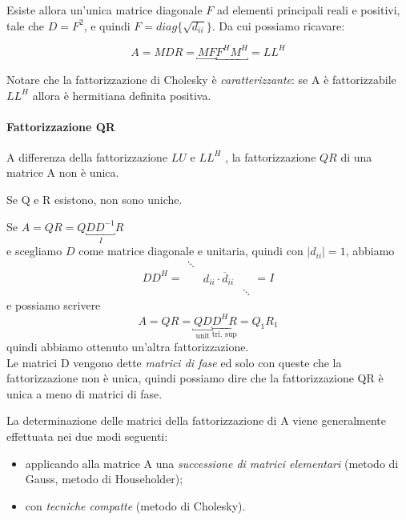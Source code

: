 \begin{thproof}
Esiste allora un’unica matrice diagonale $F$ ad elementi principali
reali e positivi, tale che $D = F^2$, e quindi $F =
diag\{\sqrt{d_{ii}}\}$. Da cui possiamo ricavare:

$$ A = MDR = \underbracket{M F} \underbracket{F^H M^H} = LL^H $$

Notare che la fattorizzazione di Cholesky \`e \emph{caratterizzante}: se
A \`e fattorizzabile $LL^H$ allora \`e hermitiana definita positiva.
\end{thproof}


\paragraph{Fattorizzazione QR}\label{fatt:QR}
A differenza della fattorizzazione $LU$ e $LL^H$ , la fattorizzazione $QR$ di
una matrice A non \`e unica. 

\begin{observation}
  Se Q e R esistono, non sono uniche.
\end{observation}
\begin{thproof}
  Se $A = QR = Q \underbracket{D D^{-1}}_{I} R$  \\
  e scegliamo $D$ come matrice diagonale e unitaria, quindi con $|d_{ii}| = 1$, abbiamo
  $$ D D^H = 
  \begin{array}{|ccc|}
    \ddots & & \\
    & d_{ii} \cdot \overline{d}_{ii} & \\
    & & \ddots
  \end{array}
  = I $$
e possiamo scrivere 
$$ A = QR = \underbracket{Q D}_{\text{unit}}
\underbracket{D^{H} R}_{\text{tri. sup}} = Q_1 R_1 $$
quindi abbiamo ottenuto un'altra fattorizzazione.\\
Le matrici D vengono dette \emph{matrici di fase} ed solo con queste
che la fattorizzazione non \`e unica, quindi possiamo dire che la
fattorizzazione QR \`e unica a meno di matrici di fase.
\end{thproof}


La determinazione delle matrici della fattorizzazione di A viene 
generalmente effettuata nei due modi seguenti:
\begin{itemize}
\item applicando alla matrice A una \emph{successione di matrici
    elementari}  (metodo di Gauss, metodo di Householder);
\item con \emph{tecniche compatte} (metodo di Cholesky).
\end{itemize}

